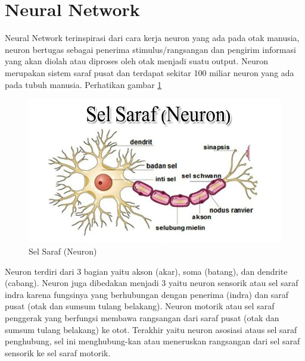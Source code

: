 \section{Neural Network}
Neural Network terinspirasi dari cara kerja neuron yang ada pada otak manusia, neuron bertugas sebagai penerima stimulus/rangsangan dan pengirim informasi yang akan diolah atau diproses oleh otak menjadi suatu output. Neuron merupakan sistem saraf pusat dan terdapat sekitar 100 miliar neuron yang ada pada tubuh manusia. Perhatikan gambar \ref{neuron}
\begin{figure}[H]
        \centerline{\includegraphics[scale=.45]{figures/neuron}}
        \caption{Sel Saraf (Neuron)}
		\label{neuron}
\end{figure}

Neuron terdiri dari 3 bagian yaitu akson (akar), soma (batang), dan dendrite (cabang). Neuron juga dibedakan menjadi 3 yaitu neuron sensorik atau sel saraf indra karena fungsinya yang berhubungan dengan penerima (indra) dan saraf pusat (otak dan sumsum tulang belakang). Neuron motorik atau sel saraf penggerak yang berfungsi membawa rangsangan dari saraf pusat (otak dan sumsum tulang belakang) ke otot. Terakhir yaitu neuron asosiasi ataus sel saraf penghubung, sel ini menghubung-kan atau meneruskan rangsangan dari sel saraf sensorik ke sel saraf motorik.

